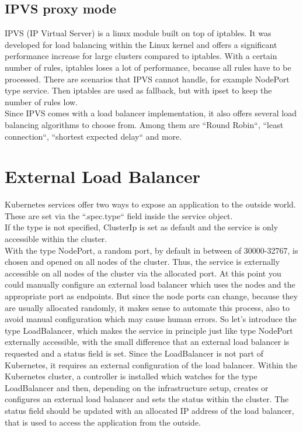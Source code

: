 \subsection{IPVS proxy mode}

IPVS (IP Virtual Server) is a linux module built on top of iptables.
It was developed for load balancing within the Linux kernel and offers a significant performance increase for large clusters compared to iptables.
With a certain number of rules, iptables loses a lot of performance, because all rules have to be processed.
There are scenarios that IPVS cannot handle, for example NodePort type service.
Then iptables are used as fallback, but with ipset to keep the number of rules low.
\\
Since IPVS comes with a load balancer implementation, it also offers several load balancing algorithms to choose from.
Among them are ``Round Robin``, ``least connection``, ``shortest expected delay`` and more.

\section{External Load Balancer}

Kubernetes services offer two ways to expose an application to the outside world.
These are set via the ``.spec.type`` field inside the service object.
\\
If the type is not specified, ClusterIp is set as default and the service is only accessible within the cluster.
\\
With the type NodePort, a random port, by default in between of 30000-32767, is chosen and opened on all nodes of the cluster.
Thus, the service is externally accessible on all nodes of the cluster via the allocated port.
At this point you could manually configure an external load balancer which uses the nodes and the appropriate port as endpoints.
But since the node ports can change, because they are usually allocated randomly, it makes sense to automate this process, also to avoid manual configuration which may cause human errors.
So let's introduce the type LoadBalancer, which makes the service in principle just like type NodePort externally accessible, with the small difference that an external load balancer is requested and a status field is set.
Since the LoadBalancer is not part of Kubernetes, it requires an external configuration of the load balancer.
Within the Kubernetes cluster, a controller is installed which watches for the type LoadBalancer and then, depending on the infrastructure setup, creates or configures an external load balancer and sets the status within the cluster.
The status field should be updated with an allocated IP address of the load balancer, that is used to access the application from the outside.

